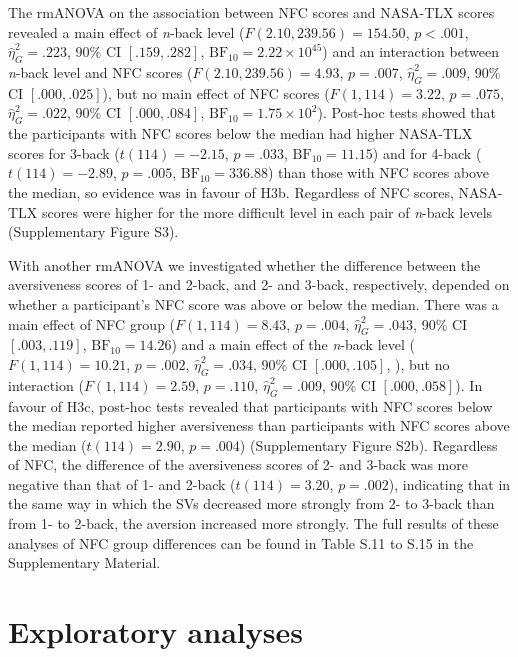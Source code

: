 \documentclass[
  man,floatsintext]{apa6}
\begin{document}
The rmANOVA on the association between NFC scores and NASA-TLX scores revealed a main effect of \emph{n}-back level (\(F(2.10, 239.56) = 154.50\), \(p < .001\), \(\hat{\eta}^2_G = .223\), 90\% CI \([.159, .282]\), \(\mathrm{BF}_{\textrm{10}} = 2.22 \times 10^{45}\)) and an interaction between \emph{n}-back level and NFC scores (\(F(2.10, 239.56) = 4.93\), \(p = .007\), \(\hat{\eta}^2_G = .009\), 90\% CI \([.000, .025]\)), but no main effect of NFC scores (\(F(1, 114) = 3.22\), \(p = .075\), \(\hat{\eta}^2_G = .022\), 90\% CI \([.000, .084]\), \(\mathrm{BF}_{\textrm{10}} = 1.75 \times 10^{2}\)).
Post-hoc tests showed that the participants with NFC scores below the median had higher NASA-TLX scores for 3-back (\(t(114) = -2.15\), \(p = .033\), \(\mathrm{BF}_{\textrm{10}} = 11.15\)) and for 4-back (\(t(114) = -2.89\), \(p = .005\), \(\mathrm{BF}_{\textrm{10}} = 336.88\)) than those with NFC scores above the median, so evidence was in favour of H3b.
Regardless of NFC scores, NASA-TLX scores were higher for the more difficult level in each pair of \emph{n}-back levels (Supplementary Figure S3).

With another rmANOVA we investigated whether the difference between the aversiveness scores of 1- and 2-back, and 2- and 3-back, respectively, depended on whether a participant's NFC score was above or below the median.
There was a main effect of NFC group (\(F(1, 114) = 8.43\), \(p = .004\), \(\hat{\eta}^2_G = .043\), 90\% CI \([.003, .119]\), \(\mathrm{BF}_{\textrm{10}} = 14.26\)) and a main effect of the \emph{n}-back level (\(F(1, 114) = 10.21\), \(p = .002\), \(\hat{\eta}^2_G = .034\), 90\% CI \([.000, .105]\), ), but no interaction (\(F(1, 114) = 2.59\), \(p = .110\), \(\hat{\eta}^2_G = .009\), 90\% CI \([.000, .058]\)).
In favour of H3c, post-hoc tests revealed that participants with NFC scores below the median reported higher aversiveness than participants with NFC scores above the median (\(t(114) = 2.90\), \(p = .004\)) (Supplementary Figure S2b).
Regardless of NFC, the difference of the aversiveness scores of 2- and 3-back was more negative than that of 1- and 2-back (\(t(114) = 3.20\), \(p = .002\)), indicating that in the same way in which the SVs decreased more strongly from 2- to 3-back than from 1- to 2-back, the aversion increased more strongly.
The full results of these analyses of NFC group differences can be found in Table S.11 to S.15 in the Supplementary Material.

\hypertarget{exploratory-analyses}{%
\section{Exploratory analyses}\label{exploratory-analyses}}
\end{document}

